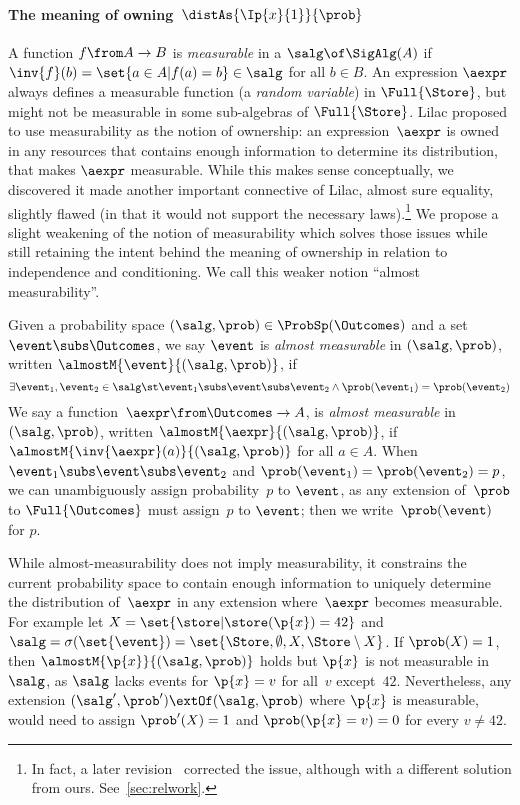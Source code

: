 \paragraph{The meaning of owning~$ \distAs{\Ip{x}{1}}{\prob} $}
A function $ f \from A \to B $ is \emph{measurable} in a \salgebra{}
$ \salg \of \SigAlg(A) $ if $ \inv{f}(b) = \set{a \in A | f(a) = b} \in \salg $
for all $b\in B$.
An expression $\aexpr$ always defines a measurable function
(\ie a \emph{random variable})
in $\Full{\Store}$,
but might not be measurable in some sub-algebras of $\Full{\Store}$.
Lilac proposed to use measurability as the notion of ownership:
an expression~$\aexpr$ is owned in any resources that contains enough
information to determine its distribution, \ie that makes $\aexpr$ measurable.
While this makes sense conceptually,
we discovered it made another important connective of Lilac,
almost sure equality, slightly flawed
(in that it would not support the necessary laws).\footnote{In fact, a later revision~\cite{lilac2} corrected the issue,
  although with a different solution from ours.
  See~\cref{sec:relwork}.}
We propose a slight weakening of the notion of measurability which solves
those issues while still retaining the intent behind the meaning of ownership in relation to independence and conditioning.
We call this weaker notion ``almost measurability''.

\begin{definition}
  \label{def:almost-meas}
  Given a probability space $ (\salg,\prob) \in \ProbSp(\Outcomes) $
  and a set $\event \subs \Outcomes$,
  we say $ \event $ is \emph{almost measurable} in $(\salg, \prob)$,
  written $ \almostM{\event}{(\salg, \prob)} $,
  if \[
    \exists \event_1,\event_2 \in \salg \st
    \event_1 \subs \event \subs \event_2
    \land
    \prob(\event_1)=\prob(\event_2)
  \]
  We say a function~$ \aexpr \from \Outcomes \to A $,
  is \emph{almost measurable} in $(\salg, \prob)$,
  written $ \almostM{\aexpr}{(\salg, \prob)} $,
  if $
  {\almostM{\inv{\aexpr}(a)}{(\salg, \prob)}}
  $
  for all $a \in A$.
When
  $ \event_1 \subs \event \subs \event_2$
  and
  $ \prob(\event_1)=\prob(\event_2)=p $,
  we can unambiguously assign probability~$p$ to $\event$,
  as any extension of~$\prob$ to $\Full{\Outcomes}$ must
  assign~$p$ to $\event$;
  then we write~$\prob(\event)$ for $p$.
\end{definition}

While almost-measurability does not imply measurability,
it constrains the current probability space to contain enough information
to uniquely determine the distribution of~$\aexpr$ in any
extension where~$\aexpr$ becomes measurable.
For example let $X=\set{\store | \store(\p{x}) = 42}$ and
$ \salg = \sigma(\set{\event}) = \set{\Store,\emptyset,X,\Store\setminus X}$.
If $ \prob(X) = 1 $, then $ \almostM{\p{x}}{(\salg,\prob)} $
holds but $\p{x}$ is not measurable in~$\salg$, as $\salg$ lacks events
for $\p{x}=v$ for all~$v$ except~$42$.
Nevertheless, any extension $(\salg',\prob') \extOf (\salg,\prob)$
where $\p{x}$ is measurable,
would need to assign $\prob'(X) = 1$ and
$\prob(\p{x}=v) = 0$ for every $v \ne 42$.

